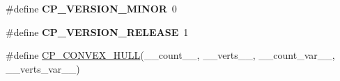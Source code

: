 \begin{DoxyCompactItemize}
\item 
\mbox{\label{group__misc_ga015d989acd6a013e84ea8696953172a8}} 
\#define {\bfseries C\+P\+\_\+\+V\+E\+R\+S\+I\+O\+N\+\_\+\+M\+I\+N\+OR}~0
\item 
\mbox{\label{group__misc_ga0311c28764c81d74c3c76570bb92c57f}} 
\#define {\bfseries C\+P\+\_\+\+V\+E\+R\+S\+I\+O\+N\+\_\+\+R\+E\+L\+E\+A\+SE}~1
\item 
\#define \mbox{\hyperlink{group__misc_ga9abe29a1fe6d1f2041e95f2fb2e2ce1c}{C\+P\+\_\+\+C\+O\+N\+V\+E\+X\+\_\+\+H\+U\+LL}}(\+\_\+\+\_\+count\+\_\+\+\_\+,  \+\_\+\+\_\+verts\+\_\+\+\_\+,  \+\_\+\+\_\+count\+\_\+var\+\_\+\+\_\+,  \+\_\+\+\_\+verts\+\_\+var\+\_\+\+\_\+)
\end{DoxyCompactItemize}
